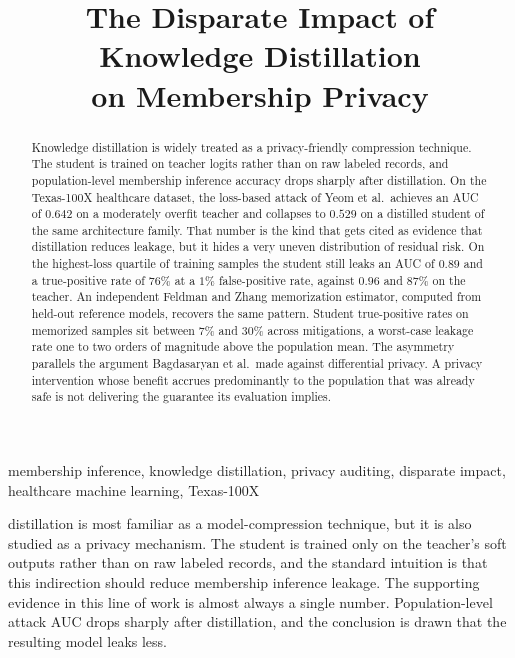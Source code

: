 \documentclass[conference]{IEEEtran}
\begin{document}
\title{The Disparate Impact of Knowledge Distillation\\
on Membership Privacy}

\author{
}

\maketitle

\begin{abstract}
Knowledge distillation is widely treated as a privacy-friendly compression technique. The student is trained on teacher logits rather than on raw labeled records, and population-level membership inference accuracy drops sharply after distillation. On the Texas-100X healthcare dataset, the loss-based attack of Yeom et al.\ achieves an AUC of $0.642$ on a moderately overfit teacher and collapses to $0.529$ on a distilled student of the same architecture family. That number is the kind that gets cited as evidence that distillation reduces leakage, but it hides a very uneven distribution of residual risk. On the highest-loss quartile of training samples the student still leaks an AUC of $0.89$ and a true-positive rate of $76\%$ at a $1\%$ false-positive rate, against $0.96$ and $87\%$ on the teacher. An independent Feldman and Zhang memorization estimator, computed from held-out reference models, recovers the same pattern. Student true-positive rates on memorized samples sit between $7\%$ and $30\%$ across mitigations, a worst-case leakage rate one to two orders of magnitude above the population mean. The asymmetry parallels the argument Bagdasaryan et al.\ made against differential privacy. A privacy intervention whose benefit accrues predominantly to the population that was already safe is not delivering the guarantee its evaluation implies.
\end{abstract}

\begin{IEEEkeywords}
membership inference, knowledge distillation, privacy auditing, disparate impact, healthcare machine learning, Texas-100X
\end{IEEEkeywords}

 distillation is most familiar as a model-compression technique, but it is also studied as a privacy mechanism. The student is trained only on the teacher's soft outputs rather than on raw labeled records, and the standard intuition is that this indirection should reduce membership inference leakage. The supporting evidence in this line of work is almost always a single number. Population-level attack AUC drops sharply after distillation, and the conclusion is drawn that the resulting model leaks less.
\end{document}
